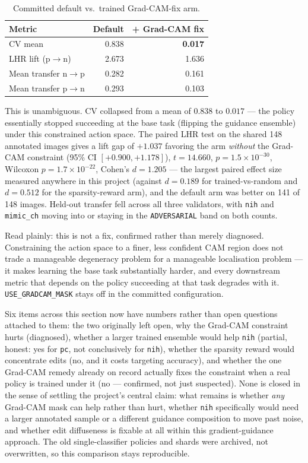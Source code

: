 \documentclass[11pt]{article}
\begin{document}
\begin{table}[h]
\centering
\caption{Committed default vs.\ trained Grad-CAM-fix arm.}
\label{tab:gradcam_fix_results}
\begin{tabular}{@{}lrr@{}}
\toprule
\textbf{Metric} & \textbf{Default} & \textbf{+ Grad-CAM fix} \\
\midrule
CV mean & 0.838 & \textbf{0.017} \\
LHR lift (p$\to$n) & 2.673 & 1.636 \\
Mean transfer n$\to$p & 0.282 & 0.161 \\
Mean transfer p$\to$n & 0.293 & 0.103 \\
\bottomrule
\end{tabular}
\end{table}

This is unambiguous. CV collapsed from a mean of $0.838$ to $0.017$ — the
policy essentially stopped succeeding at the base task (flipping the
guidance ensemble) under this constrained action space. The paired LHR
test on the shared 148 annotated images gives a lift gap of $+1.037$
favoring the arm \emph{without} the Grad-CAM constraint (95\% CI
$[+0.900, +1.178]$), $t=14.660$, $p=1.5\times10^{-30}$, Wilcoxon
$p=1.7\times10^{-22}$, Cohen's $d=1.205$ — the largest paired effect size
measured anywhere in this project (against $d=0.189$ for trained-vs-random
and $d=0.512$ for the sparsity-reward arm), and the default arm was
better on 141 of 148 images. Held-out transfer fell across all three
validators, with \texttt{nih} and \texttt{mimic\_ch} moving into or
staying in the \texttt{ADVERSARIAL} band on both counts.

Read plainly: this is not a fix, confirmed rather than merely diagnosed.
Constraining the action space to a finer, less confident CAM region does
not trade a manageable degeneracy problem for a manageable localisation
problem — it makes learning the base task substantially harder, and every
downstream metric that depends on the policy succeeding at that task
degrades with it. \texttt{USE\_GRADCAM\_MASK} stays off in the committed
configuration.

Six items across this section now have numbers rather than open
questions attached to them: the two originally left open, why the
Grad-CAM constraint hurts (diagnosed), whether a larger trained ensemble
would help \texttt{nih} (partial, honest: yes for \texttt{pc}, not
conclusively for \texttt{nih}), whether the sparsity reward would
concentrate edits (no, and it costs targeting accuracy), and whether the
one Grad-CAM remedy already on record actually fixes the constraint when
a real policy is trained under it (no — confirmed, not just suspected).
None is closed in the sense of settling the project's central claim: what
remains is whether \emph{any} Grad-CAM mask can help rather than hurt,
whether \texttt{nih} specifically would need a larger annotated sample or
a different guidance composition to move past noise, and whether edit
diffuseness is fixable at all within this gradient-guidance approach. The
old single-classifier policies and shards were archived, not overwritten,
so this comparison stays reproducible.
\end{document}
